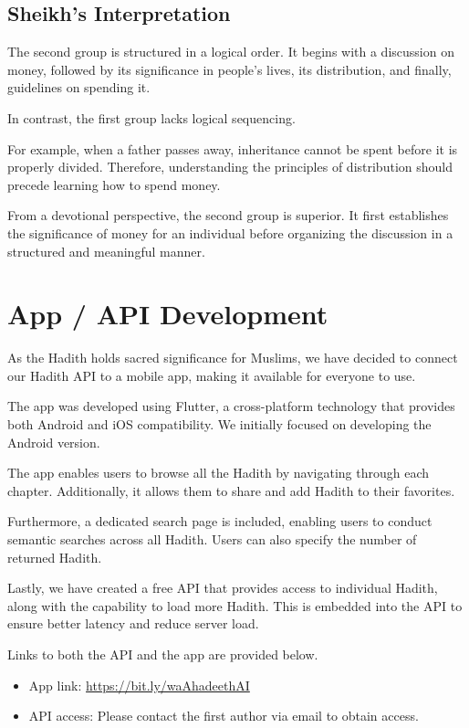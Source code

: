 \subsection*{Sheikh's Interpretation}
The second group is structured in a logical order. It begins with a discussion on money, followed by its significance in people’s lives, its distribution, and finally, guidelines on spending it.

In contrast, the first group lacks logical sequencing.

For example, when a father passes away, inheritance cannot be spent before it is properly divided. Therefore, understanding the principles of distribution should precede learning how to spend money.

From a devotional perspective, the second group is superior. It first establishes the significance of money for an individual before organizing the discussion in a structured and meaningful manner.






\section{App / API Development}

As the Hadith holds sacred significance for Muslims, we have decided to connect our Hadith API to a mobile app, making it available for everyone to use.

The app was developed using Flutter, a cross-platform technology that provides both Android and iOS compatibility. We initially focused on developing the Android version.

The app enables users to browse all the Hadith by navigating through each chapter. Additionally, it allows them to share and add Hadith to their favorites.

Furthermore, a dedicated search page is included, enabling users to conduct semantic searches across all Hadith. Users can also specify the number of returned Hadith.

Lastly, we have created a free API that provides access to individual Hadith, along with the capability to load more Hadith. This is embedded into the API to ensure better latency and reduce server load.

Links to both the API and the app are provided below.
\begin{itemize}
    \item App link: \url{https://bit.ly/waAhadeethAI}
    \item API access: Please contact the first author via email to obtain access.
\end{itemize}


